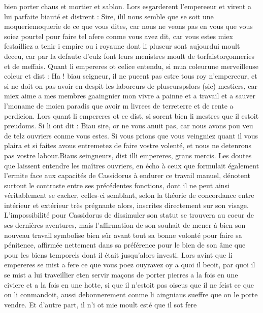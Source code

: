 \documentclass{article}
\begin{document}
\begin{pages}
      bien porter chaus et mortier et sablon. 
   Lors esgarderent l’empereeur et virent a lui parfaite biauté et distrent :
   Sire, ilil nous semble que se soit une 
      moqueriemoquerie de ce que vous dites, car nous ne veons pas en vous que vous soiez 
      pourtel pour faire tel afere conme vous avez dit, 
      car vous estes miex festailliez a tenir i empire ou 
      i royaune dont li pluseur sont aujourdui moult deceu, 
      car par la defaute d’eulz font leurs menistres moult de
      torfaistorçonneries et de meffais.
   Quant li empereres ot celice entendu, 
   si mua coleurune merveilleuse coleur et dist :
   Ha ! biau seigneur, il ne pueent pas estre tous roy n’empereeur, 
      et si ne doit on pas avoir en despit les laboreurs de 
      pluseurspslors (sic) mestiers, car miex aime a mes membres 
      gaaingnier mon vivre a painne et a travail et a sauver l’moname 
      de moien paradis que avoir m livrees de 
      terreterre et de rente a perdicion.
   Lors quant li empereres ot ce dist, 
   si sorent bien li mestres que il estoit preudoms. Si li ont dit :
   Biau sire, or ne vous anuit pas, car nous avons pou veu de telz ouvriers conme vous estes. 
      Si vous prions que vous veingniez quant il vous plaira et si 
      faites avous entremetez de faire vostre volenté, 
      et nous ne detenrons pas vostre labour.Biaus seingneurs, dist illi empereres, 
      grans mercis. Les doutes que laissent entendre les maîtres ouvriers, en écho à ceux que 
      formulait également l'ermite face aux capacités de Cassidorus à endurer ce travail manuel, dénotent surtout le contraste 
      entre ses précédentes fonctions, dont il ne peut ainsi véritablement se cacher, celles-ci semblant, selon la théorie 
      de concordance entre intérieur et extérieur très prégnante alors, inscrites directement sur son visage. L'impossibilité
      pour Cassidorus de dissimuler son statut se trouvera au coeur de ses dernières aventures, mais l'affirmation de son 
      souhait de mener à bien son nouveau travail symbolise bien sûr avant tout sa bonne volonté pour faire sa pénitence, affirmée 
      nettement dans sa préférence pour le bien de son âme que pour les biens temporels dont il était jusqu'alors investi. \pend
\pstart Lors avint que li empereres 
   se mist a fere ce que vous poez ouyravez oy a quoi il beoit, 
   par quoi il se mist a lui traveillier eten servir maçons de porter pierres 
   a la fois en une civiere et a la fois en une hotte, si que il n’estoit pas oiseus que il ne feist ce que on li conmandoit,
   aussi debonnerement conme li aingniaus sueffre que on le porte vendre. Et d’autre part, il n’i ot mie moult esté que il sot fere 

\end{pages}
\end{document}
